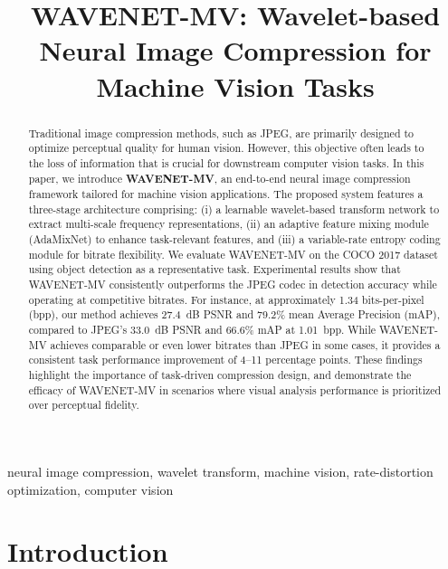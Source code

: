 \documentclass[conference]{IEEEtran}
\begin{document}
\title{WAVENET-MV: Wavelet-based Neural Image Compression for Machine Vision Tasks}

\author{
}
\maketitle

\begin{abstract}
Traditional image compression methods, such as JPEG, are primarily designed to optimize perceptual quality for human vision. However, this objective often leads to the loss of information that is crucial for downstream computer vision tasks. In this paper, we introduce \textbf{WAVENET-MV}, an end-to-end neural image compression framework tailored for machine vision applications. The proposed system features a three-stage architecture comprising: (i) a learnable wavelet-based transform network to extract multi-scale frequency representations, (ii) an adaptive feature mixing module (AdaMixNet) to enhance task-relevant features, and (iii) a variable-rate entropy coding module for bitrate flexibility. We evaluate WAVENET-MV on the COCO 2017 dataset using object detection as a representative task. Experimental results show that WAVENET-MV consistently outperforms the JPEG codec in detection accuracy while operating at competitive bitrates. For instance, at approximately 1.34 bits-per-pixel (bpp), our method achieves 27.4~dB PSNR and 79.2\% mean Average Precision (mAP), compared to JPEG’s 33.0~dB PSNR and 66.6\% mAP at 1.01~bpp. While WAVENET-MV achieves comparable or even lower bitrates than JPEG in some cases, it provides a consistent task performance improvement of 4–11 percentage points. These findings highlight the importance of task-driven compression design, and demonstrate the efficacy of WAVENET-MV in scenarios where visual analysis performance is prioritized over perceptual fidelity.
\end{abstract}

\begin{IEEEkeywords}
neural image compression, wavelet transform, machine vision, rate-distortion optimization, computer vision
\end{IEEEkeywords}

\section{Introduction}
\end{document}
